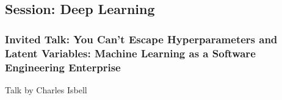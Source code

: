 \subsection{Session: Deep Learning}



\spacerule
\subsubsection{Invited Talk: 
You Can’t Escape Hyperparameters and Latent Variables: Machine Learning as a Software Engineering Enterprise}

Talk by Charles Isbell